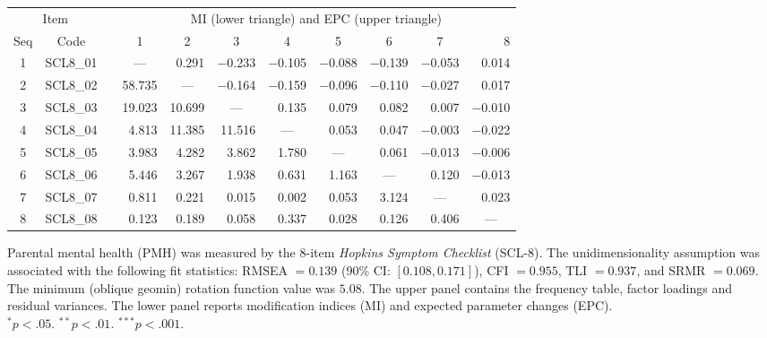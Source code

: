{    \begin{tabular}{cccrrrrrrrr}
    \toprule
    \multicolumn{2}{c}{Item} &       & \multicolumn{8}{c}{MI (lower triangle) and EPC (upper triangle)} \\
\cmidrule{1-2}\cmidrule{4-11}    Seq   & Code  &       & \multicolumn{1}{c}{1} & \multicolumn{1}{c}{2} & \multicolumn{1}{c}{3} & \multicolumn{1}{c}{4} & \multicolumn{1}{c}{5} & \multicolumn{1}{c}{6} & \multicolumn{1}{c}{7} & 8 \\
    \midrule
    1     & SCL8\_01 &       & \multicolumn{1}{c}{---} & 0.291 & $-$0.233 & $-$0.105 & $-$0.088 & $-$0.139 & $-$0.053 & 0.014 \\
    2     & SCL8\_02 &       & 58.735 & \multicolumn{1}{c}{---} & $-$0.164 & $-$0.159 & $-$0.096 & $-$0.110 & $-$0.027 & 0.017 \\
    3     & SCL8\_03 &       & 19.023 & 10.699 & \multicolumn{1}{c}{---} & 0.135 & 0.079 & 0.082 & 0.007 & $-$0.010 \\
    4     & SCL8\_04 &       & 4.813 & 11.385 & 11.516 & \multicolumn{1}{c}{---} & 0.053 & 0.047 & $-$0.003 & $-$0.022 \\
    5     & SCL8\_05 &       & 3.983 & 4.282 & 3.862 & 1.780 & \multicolumn{1}{c}{---} & 0.061 & $-$0.013 & $-$0.006 \\
    6     & SCL8\_06 &       & 5.446 & 3.267 & 1.938 & 0.631 & 1.163 & \multicolumn{1}{c}{---} & 0.120 & $-$0.013 \\
    7     & SCL8\_07 &       & 0.811 & 0.221 & 0.015 & 0.002 & 0.053 & 3.124 & \multicolumn{1}{c}{---} & 0.023 \\
    8     & SCL8\_08 &       & 0.123 & 0.189 & 0.058 & 0.337 & 0.028 & 0.126 & 0.406 & \multicolumn{1}{c}{---} \\
    \bottomrule
    \end{tabular}%
}{Parental mental health (PMH) was measured by the 8-item \textit{Hopkins Symptom Checklist} (SCL-8). The unidimensionality assumption was associated with the following fit statistics: RMSEA $= 0.139$ (90\% CI: $[0.108, 0.171]$), CFI $= 0.955$, TLI $= 0.937$, and SRMR $= 0.069$. The minimum (oblique geomin) rotation function value was $5.08$. The upper panel contains the frequency table, factor loadings and residual variances. The lower panel reports modification indices (MI) and expected parameter changes (EPC).\\
$^* p < .05$. $^{**} p < .01$. $^{***} p < .001$.
}

